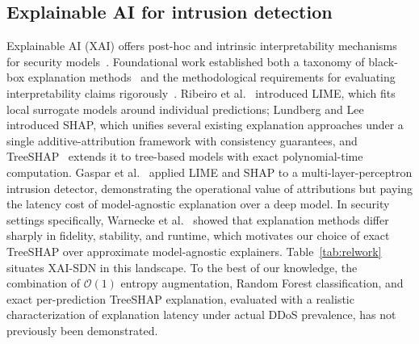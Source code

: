 ﻿\documentclass[journal]{IEEEtran}
\begin{document}
\subsection{Explainable AI for intrusion detection}
Explainable AI (XAI) offers post-hoc and intrinsic interpretability mechanisms for security models~\cite{arrieta2020xai}. Foundational work established both a taxonomy of black-box explanation methods~\cite{guidotti2018survey} and the methodological requirements for evaluating interpretability claims rigorously~\cite{doshivelez2017rigorous}. Ribeiro et al.~\cite{ribeiro2016lime} introduced LIME, which fits local surrogate models around individual predictions; Lundberg and Lee~\cite{lundberg2017shap} introduced SHAP, which unifies several existing explanation approaches under a single additive-attribution framework with consistency guarantees, and TreeSHAP~\cite{lundberg2020treeshap} extends it to tree-based models with exact polynomial-time computation. Gaspar et al.~\cite{gaspar2024xai} applied LIME and SHAP to a multi-layer-perceptron intrusion detector, demonstrating the operational value of attributions but paying the latency cost of model-agnostic explanation over a deep model. In security settings specifically, Warnecke et al.~\cite{warnecke2020evaluating} showed that explanation methods differ sharply in fidelity, stability, and runtime, which motivates our choice of exact TreeSHAP over approximate model-agnostic explainers. Table~\ref{tab:relwork} situates XAI-SDN in this landscape. To the best of our knowledge, the combination of $\mathcal{O}(1)$ entropy augmentation, Random Forest classification, and exact per-prediction TreeSHAP explanation, evaluated with a realistic characterization of explanation latency under actual DDoS prevalence, has not previously been demonstrated.
\end{document}
